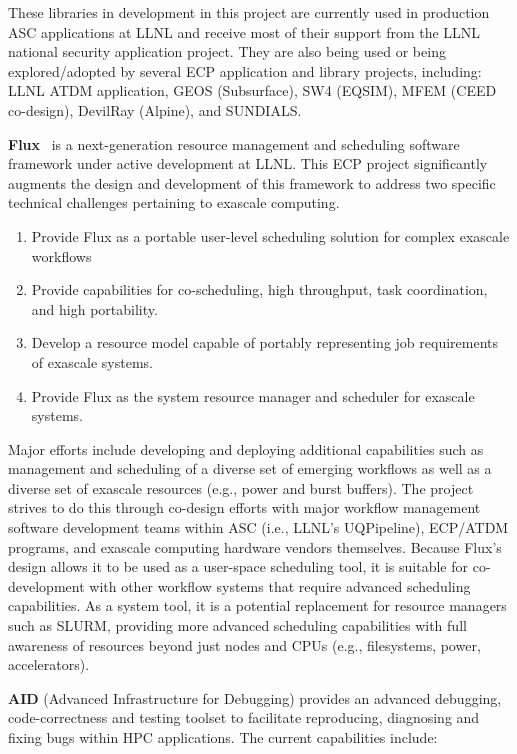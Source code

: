 These libraries in development in this project are currently used in
production ASC applications at
LLNL and receive most of their support from the LLNL national security
application project. They are also being used or being explored/adopted
by several ECP application and library projects, including: LLNL ATDM
application, GEOS (Subsurface), SW4 (EQSIM), MFEM (CEED co-design),
DevilRay (Alpine), and SUNDIALS.

\textbf{Flux}~\cite{Ahn:2014:Flux,FluxSC18} is a next-generation resource
management and scheduling software framework under active development at
LLNL. This ECP project significantly augments the design and development
of this framework to address two specific technical challenges pertaining
to exascale computing.

\begin{enumerate}
\item Provide Flux as a portable user-level scheduling solution for complex
      exascale workflows

\item Provide capabilities for co-scheduling, high throughput, task
      coordination, and high portability.

\item Develop a resource model capable of portably representing job
      requirements of exascale systems.

\item Provide Flux as the system resource manager and scheduler for exascale
      systems.
\end{enumerate}

Major efforts include developing and deploying additional capabilities
such as management and scheduling of a diverse set of emerging workflows
as well as a diverse set of exascale resources (e.g., power and burst
buffers). The project strives to do this through co-design efforts with
major workflow management software development teams within ASC (i.e.,
LLNL’s UQPipeline), ECP/ATDM programs, and exascale computing hardware
vendors themselves. Because Flux’s design allows it to be used as a
user-space scheduling tool, it is suitable for co-development with other
workflow systems that require advanced scheduling capabilities. As a
system tool, it is a potential replacement for resource managers such as
SLURM, providing more advanced scheduling capabilities with full
awareness of resources beyond just nodes and CPUs (e.g., filesystems,
power, accelerators).

\textbf{AID} (Advanced Infrastructure for Debugging) provides an advanced
debugging, code-correctness and testing toolset to facilitate
reproducing, diagnosing and fixing bugs within HPC applications. The
current capabilities include:

